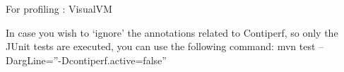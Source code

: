 For profiling \+: Visual\+VM

In case you wish to ‘ignore’ the annotations related to Contiperf, so only the JUnit tests are executed, you can use the following command\+: mvn test –\+Darg\+Line=”-\/\+Dcontiperf.active=false” 